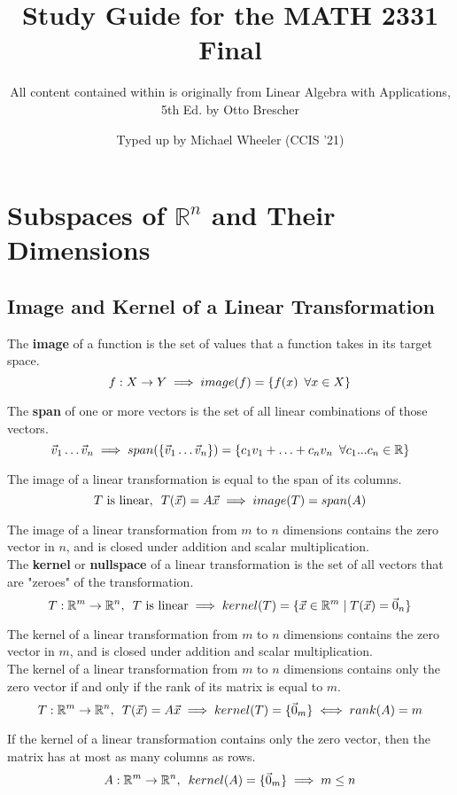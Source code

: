 \documentclass[]{scrartcl}
\title{Study Guide for the MATH 2331 Final}
\subtitle{All content contained within is originally from Linear Algebra with Applications, 5th Ed. by Otto Brescher}
\author{Typed up by Michael Wheeler (CCIS '21)}
\begin{document}
	\maketitle
	\setcounter{section}{2}
	\section{Subspaces of $\mathbb{R}^n$ and Their Dimensions}
	\subsection{Image and Kernel of a Linear Transformation}
	The \textbf{image} of a function is the set of values that a function takes in its target space.
	$$
	f: X \rightarrow Y \implies image(f) = \{ f(x) \enskip \forall x \in X \}
	$$
	
	The \textbf{span} of one or more vectors is the set of all linear combinations of those vectors.
	$$
	\vec{v}_{1} \ldots \vec{v}_{n} \implies span(\{\vec{v}_{1} \ldots \vec{v}_{n}\}) = \{
	c_{1}v_{1} + \ldots + c_{n}v_{n} \enskip \forall  c_{1}...c_{n} \in \mathbb{R}
	\}
	$$
	
	 The image of a linear transformation is equal to the span of its columns.
	$$
	T \text{ is linear}, \enskip T(\vec{x}) = A\vec{x} \implies image(T) = span(A)
	$$
	
	The image of a linear transformation from $m$ to $n$ dimensions contains the zero vector in $n$, and is closed under addition and scalar multiplication.\\
	
	The \textbf{kernel} or \textbf{nullspace} of a linear transformation is the set of all vectors that are "zeroes" of the transformation.
	$$
	T: \mathbb{R}^m \rightarrow \mathbb{R}^n, \enskip T \text{ is linear} \implies kernel(T) = \{ \vec{x} \in \mathbb{R}^m \mid T(\vec{x}) = \vec{0}_n \}
	$$
	
	The kernel of a linear transformation from $m$ to $n$ dimensions contains the zero vector in $m$, and is closed under addition and scalar multiplication.\\
	
	The kernel of a linear transformation from $m$ to $n$ dimensions contains only the zero vector if and only if the rank of its matrix is equal to $m$.
	$$
	T: \mathbb{R}^m \rightarrow \mathbb{R}^n,  \enskip T(\vec{x}) = A\vec{x} \implies kernel(T) = \{\vec{0}_m\} \iff rank(A) = m
	$$
	
	If the kernel of a linear transformation contains only the zero vector, then the matrix has at most as many columns as rows.
	$$
	A: \mathbb{R}^m \rightarrow \mathbb{R}^n, \enskip kernel(A) = \{\vec{0}_m\} \implies m \leq n
	$$
	
\end{document}

